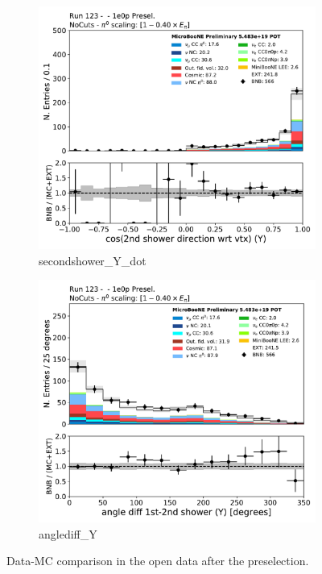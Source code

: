 \begin{figure}[H] 
\begin{center}
    \begin{subfigure}[b]{0.3\textwidth}
    \centering
    \includegraphics[width=1.00\textwidth]{1e0p/dataMCRun123/secondshower_Y_dot.pdf}
    \caption{\label{fig:1e0p:dataMCRun1:secondshower_Y_dot} secondshower\_Y\_dot }
    \end{subfigure}
    \begin{subfigure}[b]{0.3\textwidth}
    \centering
    \includegraphics[width=1.00\textwidth]{1e0p/dataMCRun123/anglediff_Y.pdf}
    \caption{\label{fig:1e0p:dataMCRun1:anglediff_Y} anglediff\_Y }
    \end{subfigure}
\caption{\label{fig:1e0p:dataMCRun1:pi02}Data-MC comparison in the open data after the \zpsel preselection.}
\end{center}
\end{figure}

